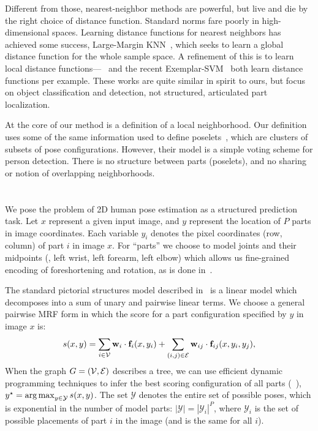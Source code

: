 Different from those, nearest-neighbor methods are powerful, but live and die 
by the right choice of distance function.  Standard norms fare poorly in 
high-dimensional spaces.  Learning distance functions for nearest neighbors has 
achieved some success, \eg Large-Margin KNN~\citep{lmknn}, which seeks to learn 
a global distance function for the whole sample space.  A refinement of this is 
to learn local distance functions---~\citep{frome07} and the recent 
Exemplar-SVM~\citep{esvm} both learn distance functions per example.  These 
works are quite similar in spirit to ours, but focus on object classification 
and detection, not structured, articulated part localization.

At the core of our method is a definition of a local neighborhood.  Our 
definition uses some of the same information used to define 
poselets~\citep{bourdev09}, which are clusters of subsets of pose 
configurations.  However, their model is a simple voting scheme for person 
detection.  There is no structure between parts (poselets), and no sharing or 
notion of overlapping neighborhoods.



\section{\LLPS}\label{sec:llps-model}

We pose the problem of 2D human pose estimation as a structured prediction 
task.  Let $x$ represent a given input image, and $y$ represent the location of 
$P$ parts in image coordinates.  Each variable $y_i$ denotes the pixel 
coordinates (row, column) of part $i$ in image $x$.  For ``parts'' we choose to 
model joints and their midpoints (\eg, left wrist, left forearm, left elbow) 
which allows us fine-grained encoding of foreshortening and rotation, as is 
done in~\citep{deva2011,sapp2011}.

The standard pictorial structures model described in~ is a linear 
model which decomposes into a sum of unary and pairwise linear terms.  We 
choose a general pairwise MRF form in which the score for a part configuration 
specified by $y$ in image $x$ is:
\begin{align}
 s(x,y) = \sum_{i \in \mathcal{V}} \mathbf{w}_i \cdot \mathbf{f}_i(x,y_i) + \sum_{(i,j) \in \mathcal{E}} 
\mathbf{w}_{ij} \cdot \mathbf{f}_{ij}(x,y_i,y_j),
 \label{eq:llps-ps}
\end{align}
When the graph $G = (\mathcal{V},\mathcal{E})$ describes a tree, we can use efficient dynamic 
programming techniques to infer the best scoring configuration of all parts 
(~), $y^\star = \mathop{\arg\max}_{y \in \mathcal{Y}} s(x,y)$.
The set $\mathcal{Y}$ denotes the entire set of possible poses, which is 
exponential in the number of model parts: $|\mathcal{Y}| = |\mathcal{Y}_i|^P$, 
where $\mathcal{Y}_i$ is the set of possible placements of part $i$ in the 
image (and is the same for all $i$).

